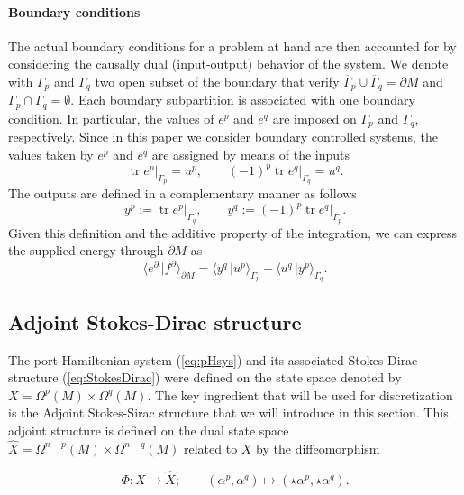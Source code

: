 \documentclass{elsarticle}
\DeclareMathOperator{\tr}{tr}
\newcommand*{\dual}[1]{\ensuremath{\widehat{#1}}}
\newcommand{\dualpr}[3][]{\ensuremath{\langle #2 \, \vert #3 \rangle_{#1}}}
\begin{document}
\paragraph{Boundary conditions}
The actual boundary conditions for a problem at hand are then accounted for by considering the causally dual
(input-output) behavior of the system. We denote with $\Gamma_p$  and $\Gamma_q$ two open subset of the boundary that   verify $\overline{\Gamma}_p \cup \overline{\Gamma}_q = \partial M$ and $\Gamma_p \cap \Gamma_q=\emptyset$. Each boundary subpartition is associated with one boundary condition. In particular, the values of $e^p$ and $e^q$ are imposed on $\Gamma_p$ and $\Gamma_q$, respectively. Since in this paper we consider boundary controlled systems, the values taken by $e^p$ and $e^q$ are assigned by means of the inputs
 \begin{equation}\label{eq:u}
    \tr e^p \vert_{\Gamma_p} = u^p, \qquad
    (-1)^p \tr e^q \vert_{\Gamma_q} = u^q.
 \end{equation}
The outputs are defined in a complementary manner as follows
 \begin{equation}\label{eq:y}
    y^p := \tr e^p \vert_{\Gamma_q}, \qquad
    y^q := (-1)^p \tr e^q \vert_{\Gamma_p}. 
 \end{equation}
Given this definition and the additive property of the integration, we can express the supplied energy through $\partial M$ as
\begin{equation}
    \dualpr[\partial M]{e^\partial}{f^\partial} =   \dualpr[\Gamma_p]{y^q}{u^p} + \dualpr[\Gamma_q]{u^q}{y^p}.
\end{equation}

\subsection{Adjoint Stokes-Dirac structure \label{sec:asds}}

The port-Hamiltonian system (\ref{eq:pHsys}) and its associated Stokes-Dirac structure (\ref{eq:StokesDirac}) were defined on the state space denoted by $X = \Omega^p(M) \times \Omega^q(M)$. The key ingredient that will be used for discretization is the Adjoint Stokes-Sirac structure that we will introduce in this section. This adjoint structure is defined on the dual state space $\dual{X} = \Omega^{n-p}(M) \times \Omega^{n-q}(M)$ related to $X$ by the diffeomorphism

\begin{equation}\label{eq:Phi_Diffeo}
	\Phi:
	X \rightarrow \dual{X} ; \qquad
	(\alpha^p, \alpha^q) \mapsto (\star\alpha^p, \star \alpha^q).
\end{equation}
\end{document}
